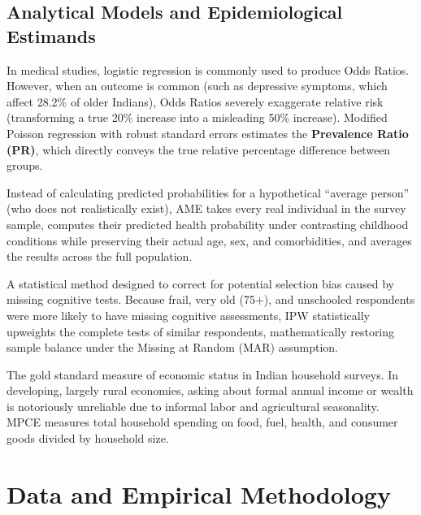 \documentclass[11pt,a4paper]{article}
\begin{document}
\subsection{Analytical Models and Epidemiological Estimands}
\begin{description}[leftmargin=0.5cm, style=nextline]
    \item[\textbf{Modified Poisson Regression vs. Odds Ratios (OR):}]
    In medical studies, logistic regression is commonly used to produce Odds Ratios. However, when an outcome is common (such as depressive symptoms, which affect 28.2\% of older Indians), Odds Ratios severely exaggerate relative risk (transforming a true 20\% increase into a misleading 50\% increase). Modified Poisson regression with robust standard errors estimates the \textbf{Prevalence Ratio (PR)}, which directly conveys the true relative percentage difference between groups.

    \item[\textbf{Average Marginal Effects / Standardized Predictions (AME):}]
    Instead of calculating predicted probabilities for a hypothetical ``average person'' (who does not realistically exist), AME takes every real individual in the survey sample, computes their predicted health probability under contrasting childhood conditions while preserving their actual age, sex, and comorbidities, and averages the results across the full population.

    \item[\textbf{Inverse-Probability Weighting (IPW):}]
    A statistical method designed to correct for potential selection bias caused by missing cognitive tests. Because frail, very old (75+), and unschooled respondents were more likely to have missing cognitive assessments, IPW statistically upweights the complete tests of similar respondents, mathematically restoring sample balance under the Missing at Random (MAR) assumption.

    \item[\textbf{Monthly Per Capita Consumption Expenditure (MPCE):}]
    The gold standard measure of economic status in Indian household surveys. In developing, largely rural economies, asking about formal annual income or wealth is notoriously unreliable due to informal labor and agricultural seasonality. MPCE measures total household spending on food, fuel, health, and consumer goods divided by household size.
\end{description}

\section{Data and Empirical Methodology}
\end{document}
